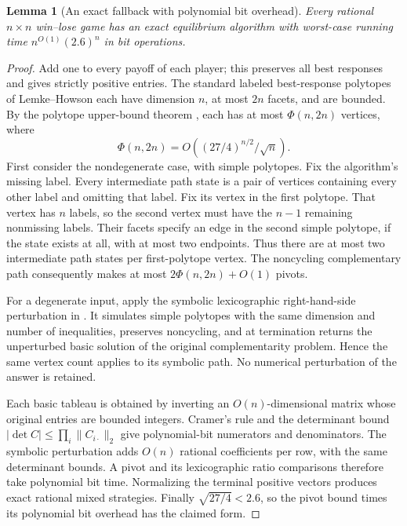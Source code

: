 \documentclass[11pt]{article}
\newtheorem{lemma}[theorem]{Lemma}
\theoremstyle{remark}
\begin{document}
\begin{lemma}[An exact fallback with polynomial bit overhead]\label{fallback}
Every rational $n\times n$ win--lose game has an exact equilibrium algorithm with worst-case running time $n^{O(1)}(2.6)^n$ in bit operations.
\end{lemma}
\begin{proof}
Add one to every payoff of each player; this preserves all best responses and gives strictly positive entries. The standard labeled best-response polytopes of Lemke--Howson each have dimension $n$, at most $2n$ facets, and are bounded. By the polytope upper-bound theorem \cite[Theorem 2.12]{stengel}, each has at most $\Phi(n,2n)$ vertices, where
\[
 \Phi(n,2n)=O\left((27/4)^{n/2}/\sqrt n\right).
\]
First consider the nondegenerate case, with simple polytopes. Fix the algorithm's missing label. Every intermediate path state is a pair of vertices containing every other label and omitting that label. Fix its vertex in the first polytope. That vertex has $n$ labels, so the second vertex must have the $n-1$ remaining nonmissing labels. Their facets specify an edge in the second simple polytope, if the state exists at all, with at most two endpoints. Thus there are at most two intermediate path states per first-polytope vertex. The noncycling complementary path consequently makes at most $2\Phi(n,2n)+O(1)$ pivots.

For a degenerate input, apply the symbolic lexicographic right-hand-side perturbation in \cite[Section 2.6]{stengel}. It simulates simple polytopes with the same dimension and number of inequalities, preserves noncycling, and at termination returns the unperturbed basic solution of the original complementarity problem. Hence the same vertex count applies to its symbolic path. No numerical perturbation of the answer is retained.

Each basic tableau is obtained by inverting an $O(n)$-dimensional matrix whose original entries are bounded integers. Cramer's rule and the determinant bound $|\det C|\leq\prod_i\|C_{i\cdot}\|_2$ give polynomial-bit numerators and denominators. The symbolic perturbation adds $O(n)$ rational coefficients per row, with the same determinant bounds. A pivot and its lexicographic ratio comparisons therefore take polynomial bit time. Normalizing the terminal positive vectors produces exact rational mixed strategies. Finally $\sqrt{27/4}<2.6$, so the pivot bound times its polynomial bit overhead has the claimed form.
\end{proof}
\end{document}
